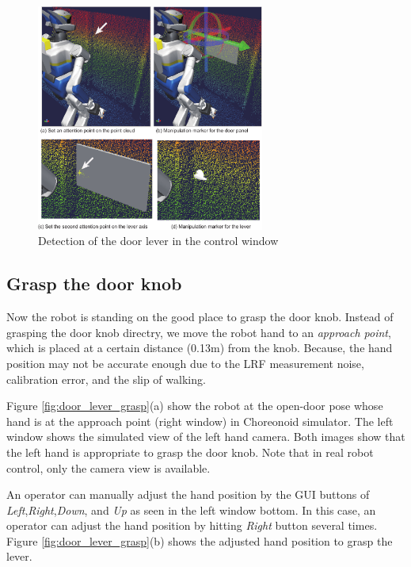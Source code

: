 \begin{figure}[t]
  \centering
  \includegraphics[width = 7.5cm]{img/door_manipulation_markers}
  \caption{Detection of the door lever in the control window}
  \label{fig:door_manip_markers}
\end{figure}
		

\subsection{Grasp the door knob}
%
Now the robot is standing on the good place to grasp the door knob.
Instead of grasping the door knob directry, we move the robot hand to an {\it approach point},
which is placed at a certain distance (0.13m) from the knob. 
Because, the hand position may not be accurate enough due to the LRF measurement noise, calibration error,
and the slip of walking.

Figure \ref{fig:door_lever_grasp}(a) show the robot at the open-door pose whose hand is at the approach point (right window) in Choreonoid simulator. The left window shows the simulated view of the left hand camera. Both images show that the left hand is appropriate to grasp the door knob. Note that in real robot control, only the camera view is available. 

 An operator can manually adjust the hand position by the GUI buttons of 
{\it Left},{\it Right},{\it Down}, and {\it Up} as seen in the left window bottom. In this case, an operator
can adjust the hand position by hitting {\it Right} button several times.
Figure \ref{fig:door_lever_grasp}(b) shows the adjusted hand position to grasp the lever.

